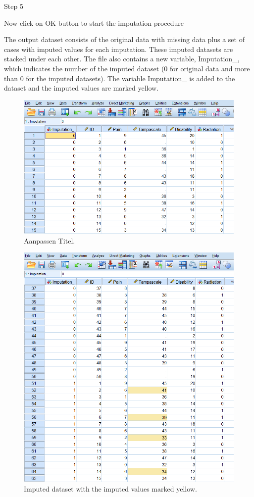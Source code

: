\documentclass[]{book}
\theoremstyle{definition}
\theoremstyle{definition}
\theoremstyle{definition}
\theoremstyle{remark}
\begin{document}
Step 5

Now click on OK button to start the imputation procedure

The output dataset consists of the original data with missing data plus
a set of cases with imputed values for each imputation. These imputed
datasets are stacked under each other. The file also contains a new
variable, Imputation\_, which indicates the number of the imputed
dataset (0 for original data and more than 0 for the imputed datasets).
The variable Imputation\_ is added to the dataset and the imputed values
are marked yellow.

\begin{figure}

{\centering \includegraphics[width=0.8\linewidth]{images/fig3.22} 

}

\caption{Aanpassen Titel.}\label{fig:fig3-22}
\end{figure}

\begin{figure}

{\centering \includegraphics[width=0.8\linewidth]{images/fig3.23} 

}

\caption{Imputed dataset with the imputed values marked yellow.}\label{fig:fig3-23}
\end{figure}
\end{document}
